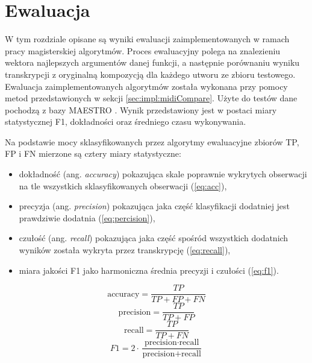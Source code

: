 \documentclass[12pt,a4paper,twoside]{mwart}
\begin{document}
\newpage
\section{Ewaluacja} \label{sec:ewal}
W tym rozdziale opisane są wyniki ewaluacji zaimplementowanych w ramach pracy magisterskiej algorytmów. Proces ewaluacyjny polega na znalezieniu wektora najlepszych argumentów danej funkcji, a następnie porównaniu wyniku transkrypcji z oryginalną kompozycją dla każdego utworu ze zbioru testowego. Ewaluacja zaimplementowanych algorytmów została wykonana przy pomocy metod przedstawionych w sekcji \ref{sec:impl:midiCompare}. Użyte do testów dane pochodzą z bazy MAESTRO \cite{Transcription:Curtis:MAESTRO}. Wynik przedstawiony jest w postaci miary statystycznej F1, dokładności oraz średniego czasu wykonywania.

Na podstawie mocy sklasyfikowanych przez algorytmy ewaluacyjne zbiorów TP, FP i FN mierzone są cztery miary statystyczne:
\begin{itemize}
  \item dokładność (ang. \textit{accuracy}) pokazująca skale poprawnie wykrytych obserwacji na tle wszystkich sklasyfikowanych obserwacji (\ref{eq:acc}),
  \item precyzja (ang. \textit{precision}) pokazująca jaka część klasyfikacji dodatniej jest prawdziwie dodatnia (\ref{eq:percision}),
  \item czułość (ang. \textit{recall}) pokazująca jaka część spośród wszystkich dodatnich wyników została wykryta przez transkrypcję (\ref{eq:recall}),
  \item miara jakości F1 jako harmoniczna średnia precyzji i czułości (\ref{eq:f1}).
\end{itemize}

\begin{equation} \label{eq:acc}
  \textrm{accuracy} = \frac{TP}{TP + FP + FN}
\end{equation}
\begin{equation} \label{eq:percision}
  \textrm{precision} = \frac{TP}{TP + FP}
\end{equation}
\begin{equation} \label{eq:recall}
  \textrm{recall} = \frac{TP}{TP + FN}
\end{equation}
\begin{equation}  \label{eq:f1}
  F1 = 2 \cdot  \frac{\textrm{precision} \cdot  \textrm{recall}}{\textrm{precision} + \textrm{recall}}
\end{equation}
\end{document}
